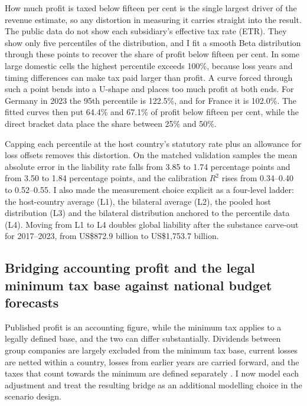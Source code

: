 \documentclass[11pt,a4paper]{article}
\newcommand{\usd}{US\$}
\begin{document}
How much profit is taxed below fifteen per cent is the single largest driver of the revenue estimate, so any distortion in measuring it carries straight into the result. The public data do not show each subsidiary's effective tax rate (ETR). They show only five percentiles of the distribution, and I fit a smooth Beta distribution through these points to recover the share of profit below fifteen per cent. In some large domestic cells the highest percentile exceeds 100\%, because loss years and timing differences can make tax paid larger than profit. A curve forced through such a point bends into a U-shape and places too much profit at both ends. For Germany in 2023 the 95th percentile is 122.5\%, and for France it is 102.0\%. The fitted curves then put 64.4\% and 67.1\% of profit below fifteen per cent, while the direct bracket data place the share between 25\% and 50\%.

Capping each percentile at the host country's statutory rate plus an allowance for loss offsets removes this distortion. On the matched validation samples the mean absolute error in the liability rate falls from 3.85 to 1.74 percentage points and from 3.50 to 1.84 percentage points, and the calibration $R^2$ rises from 0.34–0.40 to 0.52–0.55. I also made the measurement choice explicit as a four-level ladder: the host-country average (L1), the bilateral average (L2), the pooled host distribution (L3) and the bilateral distribution anchored to the percentile data (L4). Moving from L1 to L4 doubles global liability after the substance carve-out for 2017–2023, from \usd872.9 billion to \usd1,753.7 billion.

\subsection{Bridging accounting profit and the legal minimum tax base against national budget forecasts}

Published profit is an accounting figure, while the minimum tax applies to a legally defined base, and the two can differ substantially. Dividends between group companies are largely excluded from the minimum tax base, current losses are netted within a country, losses from earlier years are carried forward, and the taxes that count towards the minimum are defined separately \citep{hanlon2023}. I now model each adjustment and treat the resulting bridge as an additional modelling choice in the scenario design.
\end{document}
